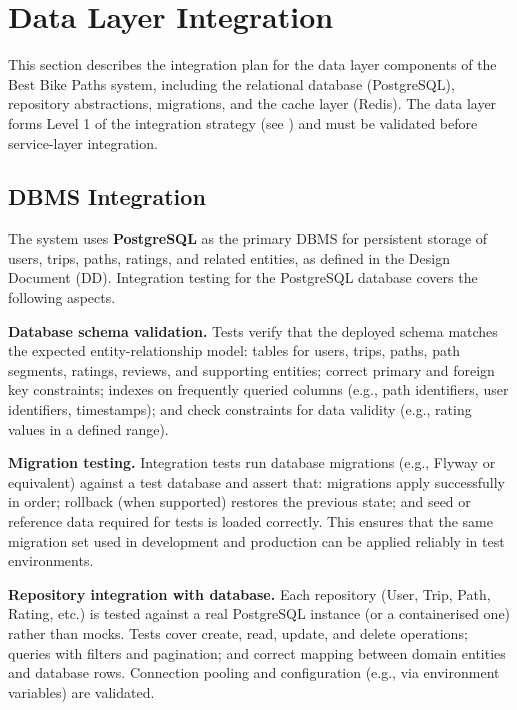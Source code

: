 \section{Data Layer Integration}
\label{sec:data_layer_integration}%

This section describes the integration plan for the data layer components of the Best Bike Paths system, including the relational database (PostgreSQL), repository abstractions, migrations, and the cache layer (Redis). The data layer forms Level 1 of the integration strategy (see ) and must be validated before service-layer integration.

\subsection{DBMS Integration}
\label{subsec:dbms_integration}%

The system uses \textbf{PostgreSQL} as the primary DBMS for persistent storage of users, trips, paths, ratings, and related entities, as defined in the Design Document (DD). Integration testing for the PostgreSQL database covers the following aspects.

\textbf{Database schema validation.} Tests verify that the deployed schema matches the expected entity-relationship model: tables for users, trips, paths, path segments, ratings, reviews, and supporting entities; correct primary and foreign key constraints; indexes on frequently queried columns (e.g., path identifiers, user identifiers, timestamps); and check constraints for data validity (e.g., rating values in a defined range).

\textbf{Migration testing.} Integration tests run database migrations (e.g., Flyway or equivalent) against a test database and assert that: migrations apply successfully in order; rollback (when supported) restores the previous state; and seed or reference data required for tests is loaded correctly. This ensures that the same migration set used in development and production can be applied reliably in test environments.

\textbf{Repository integration with database.} Each repository (User, Trip, Path, Rating, etc.) is tested against a real PostgreSQL instance (or a containerised one) rather than mocks. Tests cover create, read, update, and delete operations; queries with filters and pagination; and correct mapping between domain entities and database rows. Connection pooling and configuration (e.g., via environment variables) are validated.

